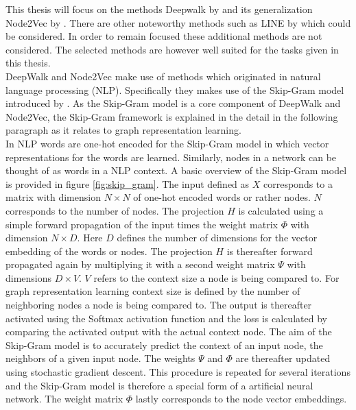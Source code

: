 	\noindent This thesis will focus on the methods Deepwalk by
	\cite{perozzi2014deepwalk} and its generalization Node2Vec by
	\cite{grover2016node2vec}. There are other noteworthy methods such as LINE
	by \cite{tang2015line} which could be considered. In order to remain
	focused these additional methods are not considered. The selected methods
	are however well suited for the tasks given in this thesis. \\

	\noindent DeepWalk and Node2Vec make use of methods which originated in 
	natural language processing (NLP). Specifically they makes use of the 
	Skip-Gram model introduced by
	\cite{mikolov2013efficient,mikolov2013distributed}. As the Skip-Gram model
	is a core component of DeepWalk and Node2Vec, the Skip-Gram framework is
	explained in the detail in the following paragraph as it relates to graph
	representation learning. \\


	\noindent In NLP words are one-hot encoded for the Skip-Gram model in which 
	vector representations for the words are learned. Similarly, nodes in a network 
	can be thought of as words in a NLP context. A basic overview of the Skip-Gram 
	model is provided in figure \ref{fig:skip_gram}. The input defined as $X$ corresponds to 
	a matrix with dimension $N \times N$ of one-hot encoded words or rather nodes. 
	$N$ corresponds to the number of nodes. The projection $H$ is calculated using 
	a simple forward propagation of the input times the weight matrix $\Phi$ with 
	dimension $N \times D$. Here $D$ defines the number of dimensions for the 
	vector embedding of the words or nodes. The projection $H$ is thereafter 
	forward propagated again by multiplying it with a second weight matrix $\Psi$ 
	with dimensions $D \times V$. $V$ refers to the context size a node is being 
	compared to. For graph representation learning context size is defined by the 
	number of neighboring nodes a node is being compared to. The output is thereafter 
	activated using the Softmax activation function and the loss is calculated
	by comparing the activated output with the actual context node. The
	aim of the Skip-Gram model is to accurately predict the context of an input
	node, the neighbors of a given input node. The weights $\Psi$ and 
	$\Phi$ are thereafter updated using stochastic gradient descent. This procedure is 
	repeated for several iterations and the Skip-Gram model is therefore a 
	special form of a artificial neural network. The weight matrix $\Phi$ lastly 
	corresponds to the node vector embeddings. \\ 

